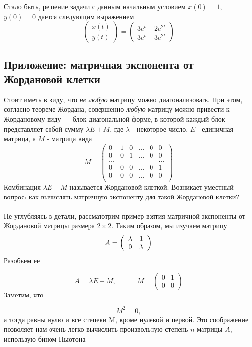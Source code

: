 \documentclass[a4paper,12pt]{article}
\begin{document}
Стало быть, решение задачи с данным начальным условием $x(0)=1$, $y(0)=0$ дается следующим выражением
\[
\begin{pmatrix}
x(t)\\
y(t)
\end{pmatrix}
=
\begin{pmatrix}
3e^t-2e^{2t}\\
3e^t-3e^{2t}
\end{pmatrix}
\]
\subsection*{Приложение: матричная экспонента от Жордановой клетки}
Стоит иметь в виду, что \textit{не любую} матрицу можно диагонализовать. При этом, согласно теореме Жордана, совершенно \textit{любую} матрицу можно привести к Жордановому виду --- блок-диагональной форме, в которой каждый блок представляет собой сумму $\lambda E + M$, где $\lambda$ - некоторое число, $E$ - единичная матрица, а $M$ - матрица вида
\[
M=
\begin{pmatrix}
0 & 1 & 0 & ... & 0 & 0\\
0 & 0 & 1 & ... & 0 & 0\\
... &  &  &  &  & ...\\
0 & 0 & 0 & ... & 0 & 1\\
0 & 0 & 0 & ... & 0 & 0\\
\end{pmatrix}
\]
Комбинация $\lambda E + M$ называется Жордановой клеткой.
Возникает уместный вопрос: как вычислять матричную экспоненту для такой Жордановой клетки?\\\\
Не углубляясь в детали, рассматотрим пример взятия матричной экспоненты от Жордановой матрицы размера $2\times2$. Таким образом, мы изучаем матрицу
\begin{equation}
A=\left(\begin{array}{cc}
\lambda & 1\\
0 & \lambda
\end{array}\right)
\notag
\end{equation}
Разобьем ее

\[
A=\lambda E+M,\quad\quad\quad M=\left(\begin{array}{cc}
0 & 1\\
0 & 0
\end{array}\right)
\]
Заметим, что

\[
M^{2}=0,
\]
а тогда равны нулю и все степени M, кроме нулевой и первой. Это соображение позволяет нам очень легко вычислить произвольную степень $n$ матрицы $A$, использую бином Ньютона
\end{document}
